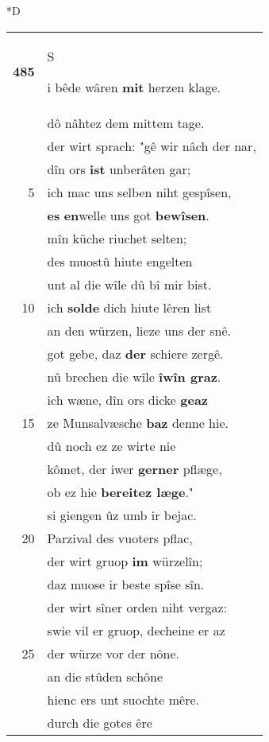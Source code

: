 \documentclass[8pt,a4paper,notitlepage]{article}
\begin{document}
\begin{table}[ht]
\begin{minipage}[t]{0.5\linewidth}
\small
\begin{center}*D
\end{center}
\begin{tabular}{rl}
\textbf{485} & \begin{large}S\end{large}i bêde wâren \textbf{mit} herzen klage.\\ 
 & dô nâhtez dem mittem tage.\\ 
 & der wirt sprach: "gê wir nâch der nar,\\ 
 & dîn ors \textbf{ist} unberâten gar;\\ 
5 & ich mac uns selben niht gespîsen,\\ 
 & \textbf{es} \textbf{en}welle uns got \textbf{bewîsen}.\\ 
 & mîn küche riuchet selten;\\ 
 & des muostû hiute engelten\\ 
 & unt al die wîle dû bî mir bist.\\ 
10 & ich \textbf{solde} dich hiute lêren list\\ 
 & an den würzen, lieze uns der snê.\\ 
 & got gebe, daz \textbf{der} schiere zergê.\\ 
 & nû brechen die wîle \textbf{îwîn graz}.\\ 
 & ich wæne, dîn ors dicke \textbf{geaz}\\ 
15 & ze Munsalvæsche \textbf{baz} denne hie.\\ 
 & dû noch ez ze wirte nie\\ 
 & kômet, der iwer \textbf{gerner} pflæge,\\ 
 & ob ez hie \textbf{bereitez læge}."\\ 
 & si giengen ûz umb ir bejac.\\ 
20 & Parzival des vuoters pflac,\\ 
 & der wirt gruop \textbf{im} würzelîn;\\ 
 & daz muose ir beste spîse sîn.\\ 
 & der wirt sîner orden niht vergaz:\\ 
 & swie vil er gruop, decheine er az\\ 
25 & der würze vor der nône.\\ 
 & an die stûden schône\\ 
 & hienc ers unt suochte mêre.\\ 
 & durch die gotes êre\\ 

\end{tabular}
\end{minipage}
\end{table}
\end{document}

